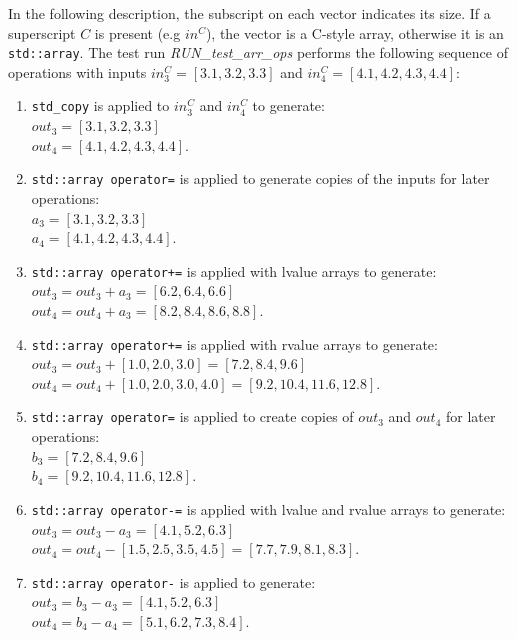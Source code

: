 \documentclass[11pt,fleqn]{report}
\begin{document}
In the following description, the subscript on each vector indicates its size.
If a superscript $C$ is present (e.g $in^C$), the vector is a C-style array, otherwise it is
an \texttt{std::array}. The test run \textit{RUN\_test\_arr\_ops} performs the following 
sequence of operations 
with inputs $in^C_3 = [3.1, 3.2, 3.3]$ and $in^C_4 = [4.1, 4.2, 4.3, 4.4]$:
\begin{enumerate}
    \item \texttt{std\_copy} is applied to $in^C_3$ and $in^C_4$ to generate: \\
        $out_3 = [3.1, 3.2, 3.3]$  \\ $out_4 = [4.1, 4.2, 4.3, 4.4]$.
    \item \texttt{std::array operator=} is applied to generate copies of the inputs for 
        later operations: \\
        $a_3 = [3.1, 3.2, 3.3]$ \\
        $a_4 = [4.1, 4.2, 4.3, 4.4]$.
    \item \texttt{std::array operator+=} is applied with lvalue arrays to generate: \\
        $out_3 = out_3 + a_3 = [6.2, 6.4, 6.6]$ \\ 
        $out_4 = out_4 + a_3 = [8.2, 8.4, 8.6, 8.8]$.
    \item \texttt{std::array operator+=} is applied with rvalue arrays to generate: \\
        $out_3 = out_3 + [1.0, 2.0, 3.0] = [7.2, 8.4, 9.6]$  \\ 
        $out_4 = out_4 + [1.0, 2.0, 3.0, 4.0] = [9.2, 10.4, 11.6, 12.8]$.
    \item \texttt{std::array operator=} is applied to create copies of $out_3$ and $out_4$ for 
        later operations: \\
        $b_3 = [7.2, 8.4, 9.6]$  \\ $b_4 = [9.2, 10.4, 11.6, 12.8]$.
    \item \texttt{std::array operator-=} is applied with lvalue and rvalue arrays to generate: \\
        $out_3 = out_3 - a_3 = [4.1, 5.2, 6.3]$  \\ 
        $out_4 = out_4 - [1.5, 2.5, 3.5, 4.5] = [7.7, 7.9, 8.1, 8.3]$.
    \item \texttt{std::array operator-} is applied to generate: \\
        $out_3 = b_3 - a_3 = [4.1, 5.2, 6.3]$  \\ 
        $out_4 = b_4 - a_4 = [5.1, 6.2, 7.3, 8.4]$.

\end{enumerate}
\end{document}
